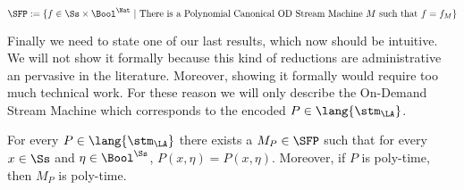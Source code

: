 \begin{defn}[$\SFPOD$]
  \label{def:sfpod}
  \[
  \SFP := \{ f \in \Ss \times \Bool^\Nat~|~ \text{There is a Polynomial Canonical OD Stream
  Machine $M$ such that }f=f_M\}
  \]
  \normalsize
\end{defn}


Finally we need to state one of our last results, which now should be intuitive.
We will not show it formally because this kind of reductions are administrative
an pervasive in the literature. Moreover, showing it formally would require too
much technical work.
%
For these reason we will only describe the On-Demand Stream Machine
which corresponds to the encoded $P \in \lang{\stm_\LA}$.

\begin{prop}
  \label{prop:SFPODimplSIFPLA}
  For every $P \in \lang{\stm_\LA}$ there exists a $M_P \in \SFP$ such that
  for every $x \in \Ss$ and $\eta \in \Bool^\Ss$, $P(x, \eta)=P(x, \eta)$.
  Moreover, if $P$ is poly-time, then $M_P$ is poly-time.
\end{prop}

